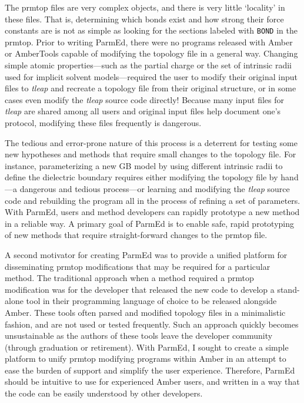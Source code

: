 The prmtop files are very complex objects, and there is very little `locality' in
these files. That is, determining which bonds exist and how strong their force
constants are is not as simple as looking for the sections labeled with
{\tt BOND} in the prmtop. Prior to writing ParmEd, there were no programs
released with Amber or AmberTools capable of modifying the topology file in a
general way. Changing simple atomic properties---such as the partial charge or
the set of intrinsic radii used for implicit solvent models---required the user
to modify their original input files to \emph{tleap} and recreate a topology
file from their original structure, or in some cases even modify the
\emph{tleap} source code directly! Because many input files for \emph{tleap} are
shared among all users and original input files help document one's protocol,
modifying these files frequently is dangerous.

The tedious and error-prone nature of this process is a deterrent for testing
some new hypotheses and methods that require small changes to the topology file.
For instance, parameterizing a new GB model by using different intrinsic radii
to define the dielectric boundary requires either modifying the topology file by
hand---a dangerous and tedious process---or learning and modifying the
\emph{tleap} source code and rebuilding the program all in the process of
refining a set of parameters. With ParmEd, users and method developers can
rapidly prototype a new method in a reliable way. A primary goal of ParmEd is to
enable safe, rapid prototyping of new methods that require straight-forward
changes to the prmtop file.

A second motivator for creating ParmEd was to provide a unified platform for
disseminating prmtop modifications that may be required for a particular method.
The traditional approach when a method required a prmtop modification was for
the developer that released the new code to develop a stand-alone tool in their
programming language of choice to be released alongside Amber. These tools often
parsed and modified topology files in a minimalistic fashion, and are not used
or tested frequently. Such an approach quickly becomes unsustainable as the
authors of these tools leave the developer community (\eg through graduation or
retirement). With ParmEd, I sought to create a simple platform to unify prmtop
modifying programs within Amber in an attempt to ease the burden of support and
simplify the user experience. Therefore, ParmEd should be intuitive to use for
experienced Amber users, and written in a way that the code can be easily
understood by other developers.

